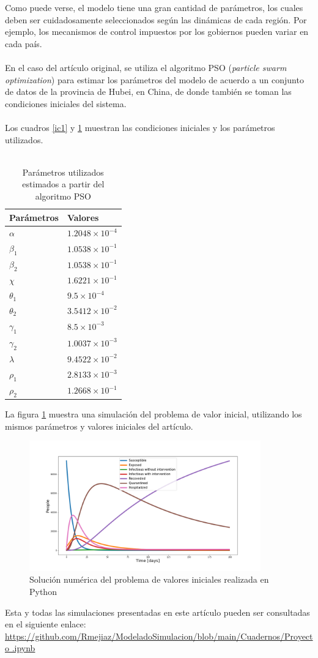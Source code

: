\documentclass[conference]{IEEEtran}
\begin{document}
Como puede verse, el modelo tiene una gran cantidad de parámetros, los cuales deben
ser cuidadosamente seleccionados según las dinámicas de cada región. Por ejemplo, los 
mecanismos de control impuestos por los gobiernos pueden variar en cada país.
\\\\
En el caso del artículo original, se utiliza el algoritmo PSO (\textit{particle swarm optimization})
para estimar los parámetros del modelo de acuerdo a un conjunto de datos de la provincia
de Hubei, en China, de donde también se toman las condiciones iniciales del sistema.
\\\\
Los cuadros \ref{ic1} y \ref{p1} muestran las condiciones iniciales y los parámetros
utilizados.
\\\\
\begin{table}[h]
    \centering
    \begin{tabular}{ll}
    \hline
    Parámetros  & Valores                 \\ \hline
    $\alpha$    & $1.2048 \times 10^{-4}$ \\ 
    $\beta_1$   & $1.0538 \times 10^{-1}$ \\ 
    $\beta_2$   & $1.0538 \times 10^{-1}$ \\ 
    $\chi$      & $1.6221 \times 10^{-1}$ \\ 
    $\theta_1 $ & $9.5 \times 10^{-4}$    \\ 
    $\theta_2$  & $3.5412 \times 10^{-2}$ \\ 
    $\gamma_1$  & $8.5 \times 10^{-3}$    \\ 
    $\gamma_2$  & $1.0037 \times 10^{-3}$ \\ 
    $\lambda$   & $9.4522 \times 10^{-2}$ \\ 
    $\rho_1 $   & $2.8133 \times 10^{-3}$ \\ 
    $\rho_2$    & $1.2668 \times 10^{-1}$ \\ \hline
    \end{tabular}
    \caption{Parámetros utilizados estimados a partir del algoritmo PSO}
    \label{p1}
    \end{table}
La figura \ref{pvi_1} muestra una simulación del problema de valor inicial, utilizando
los mismos parámetros y valores iniciales del artículo.

\begin{figure}[h]
    \centering
    \includegraphics[width=10cm]{../Figures/ivp_1.png}
    \caption{Solución numérica del problema de valores iniciales realizada en Python}
    \label{pvi_1}
\end{figure}

Esta y todas las simulaciones presentadas en este artículo pueden ser consultadas en 
el siguiente enlace: \href{https://github.com/Rmejiaz/ModeladoSimulacion/blob/main/Cuadernos/Proyecto.ipynb}{https://github.com/Rmejiaz/ModeladoSimulacion/blob/main/Cuadernos/Proyecto
.ipynb}
\end{document}
